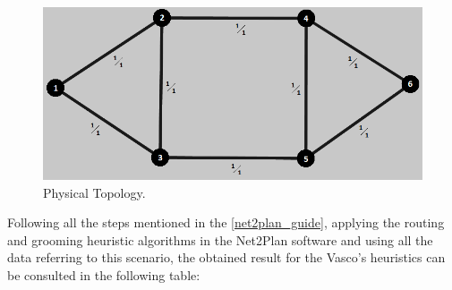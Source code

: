 \begin{figure}[H]
\centering
\includegraphics[width=13cm]{sdf/heuristic/figures/topologies/opaque_protec/high/physical_topology_high}
\caption{Physical Topology.}
\label{physical_topology_surv_ref_high_heuristic}
\end{figure}

Following all the steps mentioned in the \ref{net2plan_guide}, applying the routing and grooming heuristic algorithms in the Net2Plan software and using all the data referring to this scenario, the obtained result for the Vasco's heuristics can be consulted in the following table:

